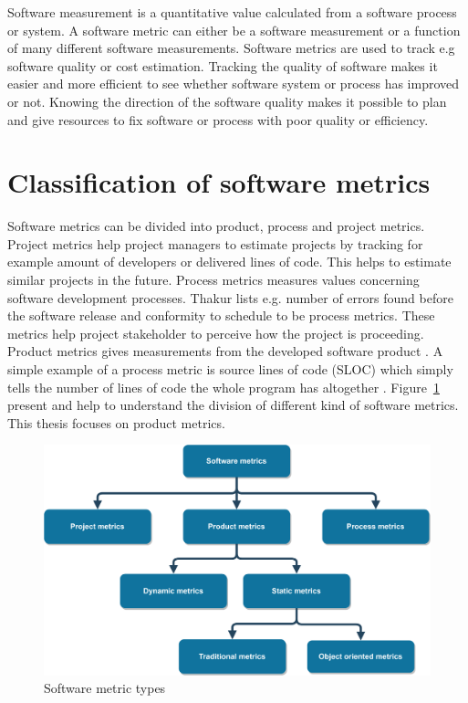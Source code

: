 Software measurement is a quantitative value calculated from a software process or system. A software metric can either be a software measurement or a function of many different software measurements. Software metrics are used to track e.g software quality or cost estimation. Tracking the quality of software makes it easier and more efficient to see whether software system or process has improved or not. Knowing the direction of the software quality makes it possible to plan and give resources to fix software or process with poor quality or efficiency. 

\section{Classification of software metrics}

Software metrics can be divided into product, process and project metrics. Project metrics \cite{dineshthakur} help project managers to estimate projects by tracking for example amount of developers or delivered lines of code. This helps to estimate similar projects in the future. Process metrics measures values concerning software development processes. Thakur lists e.g. number of errors found before the software release and conformity to schedule to be process metrics. These metrics help project stakeholder to perceive how the project is proceeding.
Product metrics gives measurements from the developed software product \cite{sommerville2011software}.  A simple example of a process metric is source lines of code (SLOC) which simply tells the number of lines of code the whole program has altogether \cite{nguyen2007sloc}. Figure~\ref{fig:metrictree} present and help to understand the division of different kind of software metrics. This thesis focuses on product metrics. 

\begin{figure}[t!]
\centering
\includegraphics[scale=0.05]{metrictree.png}
\caption{Software metric types}
\label{fig:metrictree}
\end{figure}

